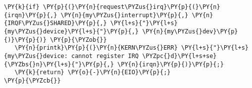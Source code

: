 \begin{Verbatim}[commandchars=\\\{\}]
\PY{k}{if} \PY{p}{(}\PY{n}{request\PYZus{}irq}\PY{p}{(}\PY{n}{irqn}\PY{p}{,} \PY{n}{my\PYZus{}interrupt}\PY{p}{,} \PY{n}{IRQF\PYZus{}SHARED}\PY{p}{,} \PY{l+s}{"}\PY{l+s}{my\PYZus{}device}\PY{l+s}{"}\PY{p}{,} \PY{n}{my\PYZus{}dev}\PY{p}{)}\PY{p}{)} \PY{p}{\PYZob{}}
   \PY{n}{printk}\PY{p}{(}\PY{n}{KERN\PYZus{}ERR} \PY{l+s}{"}\PY{l+s}{my\PYZus{}device: cannot register IRQ \PYZpc{}d}\PY{l+s+se}{\PYZbs{}n}\PY{l+s}{"}\PY{p}{,} \PY{n}{irqn}\PY{p}{)}\PY{p}{;}
   \PY{k}{return} \PY{o}{-}\PY{n}{EIO}\PY{p}{;}
\PY{p}{\PYZcb{}}
\end{Verbatim}
